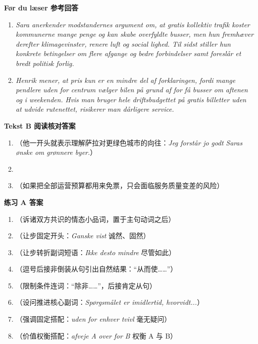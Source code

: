 \begin{answerbox}
\textbf{Før du læser 参考回答}
\begin{enumerate}
  \item \textit{Sara anerkender modstandernes argument om, at gratis kollektiv trafik koster kommunerne mange penge og kan skabe overfyldte busser, men hun fremhæver derefter klimagevinster, renere luft og social lighed. Til sidst stiller hun konkrete betingelser om flere afgange og bedre forbindelser samt foreslår et bredt politisk forlig.}
  \item \textit{Henrik mener, at pris kun er en mindre del af forklaringen, fordi mange pendlere uden for centrum vælger bilen på grund af for få busser om aftenen og i weekenden. Hvis man bruger hele driftsbudgettet på gratis billetter uden at udvide rutenettet, risikerer man dårligere service.}
\end{enumerate}

\textbf{Tekst B 阅读核对答案}
\begin{enumerate}
  \item {}（他一开头就表示理解萨拉对更绿色城市的向往：\textit{Jeg forstår jo godt Saras ønske om grønnere byer.}）
  \item {}
  \item {}（如果把全部运营预算都用来免票，只会面临服务质量变差的风险）
\end{enumerate}

\textbf{练习 A 答案}
\begin{enumerate}
  \item {}（诉诸双方共识的情态小品词，置于主句动词之后）
  \item {}（让步固定开头：\textit{Ganske vist} 诚然、固然）
  \item {}（让步转折副词短语：\textit{Ikke desto mindre} 尽管如此）
  \item {}（逗号后接非倒装从句引出自然结果：“从而使……”）
  \item {}（限制条件连词：“除非……”，后接肯定从句）
  \item {}（设问推进核心副词：\textit{Spørgsmålet er imidlertid, hvorvidt...}）
  \item {}（强调固定搭配：\textit{uden for enhver tvivl} 毫无疑问）
  \item {}（价值权衡搭配：\textit{afveje A over for B} 权衡 A 与 B）
\end{enumerate}


\end{answerbox}
